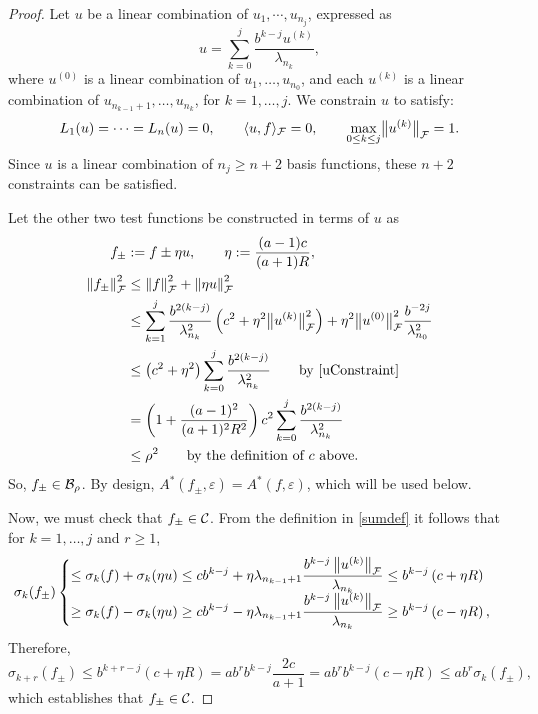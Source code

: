 \documentclass[graybox,footinfo]{svmult}
\newcommand{\DHJRnorm}[2][{}]{\ensuremath{\left \lVert #2 \right \rVert}_{#1}}
\newcommand{\DHJRbignorm}[2][{}]{\ensuremath{\bigl \lVert #2 \bigr \rVert}_{#1}}
\begin{document}
\begin{proof}
Let $u$ be a linear combination of $u_1, \cdots, u_{n_j}$, expressed as
\[
u =  \sum_{k=0}^{j}\frac{b^{k-j}u^{(k)}}{\lambda_{n_k}},
\]
where $u^{(0)}$ is a linear combination of $u_{1}, \ldots, u_{n_0}$, and each $u^{(k)}$ is a linear combination of $u_{n_{k-1}+1}, \ldots, u_{n_k}$, for $k =1, \ldots, j$.  We constrain $u$ to satisfy:
\begin{equation}\label{uConstraint}
L_1(u) = \cdots = L_n(u) = 0, \qquad \langle u,f \rangle_{\calF} = 0, \qquad 
\max_{0\le k\le j} \DHJRbignorm[\calF]{u^{(k)}} = 1.
\end{equation}
Since $u$ is a linear combination of $n_j  \ge n+2$ basis functions, these $n+2$ constraints can be satisfied.

Let the other two test functions be constructed in terms of $u$ as 
\begin{align}
\nonumber
f_\pm & := f \pm \eta u, \qquad \eta : =  \frac {(a-1)c}{(a+1)R}, \\
\nonumber
\DHJRnorm[\calF]{f_\pm}^2 & \le \DHJRnorm[\calF]{f}^2 + \DHJRnorm[\calF]{\eta u }^2  \\
& \nonumber 
\le \sum_{k=1}^j \frac{ b^{2(k-j)}}{\lambda^2_{n_{k}}} \left(c^2+ \eta^2 \DHJRbignorm[\calF]{u^{(k)}}^2\right) + \eta^2 \DHJRbignorm[\calF]{u^{(0)}}^2 \frac{b^{-2j}}{\lambda_{n_0}^2}\\
\nonumber
& \le  \left(c^2+ \eta^2 \right) \sum_{k=0}^j \frac{ b^{2(k-j)}}{\lambda^2_{n_{k}}}  \qquad \text{by \eqref{uConstraint}}\\
& \nonumber = \left(1+\frac{(a-1)^2}{(a+1)^{2} R^2 }\right)c^2 \sum_{k=0}^j\frac{ b^{2(k-j)}}{\lambda^2_{n_{k}}} \\
& \nonumber 
\le \rho^2 \qquad \text{by the definition of $c$ above}.
\end{align} 
So, $f_{\pm} \in {\mathcal{B}}_{\rho}$.  By design, $A^*(f_\pm,\varepsilon) = A^*(f,\varepsilon)$, which will be used below.

Now, we must check that $f_\pm \in {\mathcal{C}}$. From the definition in \eqref{sumdef} it follows that for $k = 1, \ldots, j$ and $r \ge 1$,
\begin{equation*}
\sigma_k(f_\pm)  \begin{cases} 
\displaystyle
\le \sigma_k(f) + \sigma_k(\eta u)\le 
c b^{k-j} + \eta\lambda_{n_{k-1}+1}\frac{b^{k-j}\DHJRnorm[\calF]{u^{(k)} } }{\lambda_{n_k}}
\le b^{k-j}\left(c+\eta R \right) 
\\[1ex]
\displaystyle
\ge \sigma_k(f) - \sigma_k(\eta u)\ge 
c b^{k-j} - \eta\lambda_{n_{k-1}+1}\frac{b^{k-j}\DHJRnorm[\calF]{u^{(k)} } }{\lambda_{n_k}}
\ge b^{k-j}\left(c-\eta R \right) , 
\end{cases}
\end{equation*}
Therefore, 
\begin{equation*}
\sigma_{k+r}(f_\pm)
\le b^{k+r-j}(c+\eta R) = ab^r b^{k-j}\frac{2c}{a+1}
=ab^r b^{k-j}\left(c-\eta R \right) \le a b^r \sigma_{k}(f_\pm),
\end{equation*}
which establishes that $f_\pm \in {\mathcal{C}}$.


\end{proof}
\end{document}
